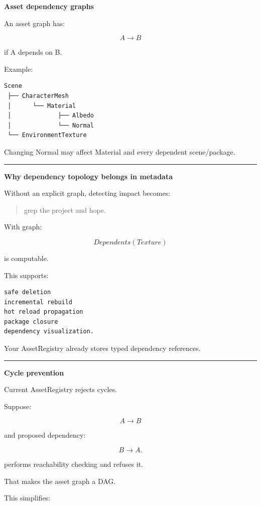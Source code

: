 \textbf{Asset dependency graphs}

An asset graph has:

\[
A\rightarrow B
\]

if A depends on B.

Example:

\begin{verbatim}
Scene
 ├── CharacterMesh
 │      └── Material
 │             ├── Albedo
 │             └── Normal
 └── EnvironmentTexture
\end{verbatim}

Changing Normal may affect Material and every dependent scene/package.

\begin{center}\rule{0.5\linewidth}{0.5pt}\end{center}

\textbf{Why dependency topology belongs in metadata}

Without an explicit graph, detecting impact becomes:

\begin{quote}
grep the project and hope.
\end{quote}

With graph:

\[
Dependents(Texture)
\]

is computable.

This supports:

\begin{verbatim}
safe deletion
incremental rebuild
hot reload propagation
package closure
dependency visualization.
\end{verbatim}

Your AssetRegistry already stores typed dependency references.

\begin{center}\rule{0.5\linewidth}{0.5pt}\end{center}

\textbf{Cycle prevention}

Current AssetRegistry rejects cycles.

Suppose:

\[
A\rightarrow B
\]

and proposed dependency:

\[
B\rightarrow A.
\]

 performs reachability checking and refuses it.

That makes the asset graph a DAG.

This simplifies:

